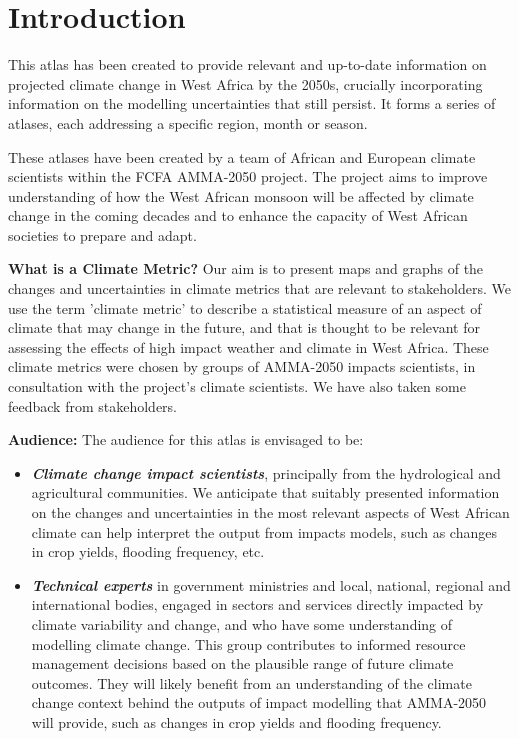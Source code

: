 \section{Introduction} \label{sec:intro}

This atlas has been created to provide relevant and up-to-date information on projected climate change in West Africa by the 2050s, crucially incorporating information on the modelling uncertainties that still persist. It forms a series of atlases, each addressing a specific region, month or season.

These atlases have been created by a team of African and European climate scientists within the FCFA AMMA-2050 project. The project aims to improve understanding of how the West African monsoon will be affected by climate change in the coming decades and to enhance the capacity of West African societies to prepare and adapt. 

\textbf{What is a Climate Metric?} Our aim is to present maps and graphs of the changes and uncertainties in climate metrics that are relevant to stakeholders. We use the term 'climate metric' to describe a statistical measure of an aspect of climate that may change in the future, and that is thought to be relevant for assessing the effects of high impact weather and climate in West Africa. These climate metrics were chosen by groups of AMMA-2050 impacts scientists, in consultation with the project's climate scientists. We have also taken some feedback from stakeholders.

\textbf{Audience:} The audience for this atlas is envisaged to be:

\begin{itemize}
  \item \textbf{\textit{Climate change impact scientists}}, principally from the hydrological and agricultural communities. We anticipate that suitably presented information on the changes and uncertainties in the most relevant aspects of West African climate can help interpret the output from impacts models, such as changes in crop yields, flooding frequency, etc.

  \item \textbf{\textit{Technical experts}} in government ministries and local, national, regional and international bodies, engaged in sectors and services directly impacted by climate variability and change, and who have some understanding of modelling climate change. This group contributes to informed resource management decisions based on the plausible range of future climate outcomes. They will likely benefit from an understanding of the climate change context behind the outputs of impact modelling that AMMA-2050 will provide, such as changes in crop yields and flooding frequency. 

\end{itemize}

